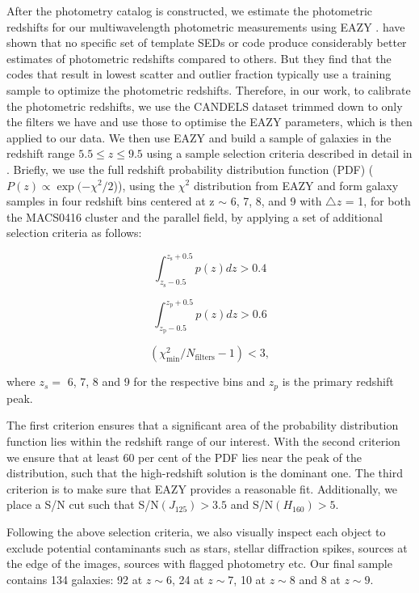 \documentclass[twocolumn]{aastex63}
\begin{document}
After the photometry catalog is constructed, we estimate the photometric redshifts for our multiwavelength photometric measurements using  EAZY \citep{Brammer2008}. \citet{Dahlen2013} have shown that no specific set of template SEDs or code produce considerably better estimates of photometric redshifts compared to others. But they find that the codes that result in lowest scatter and outlier fraction typically use a training sample to optimize the photometric redshifts. Therefore, in our work, to calibrate the photometric redshifts, we use the CANDELS dataset \citep{Guo2013} trimmed down to only the filters we have and use those to optimise the EAZY parameters, which is then applied to our data. We then use EAZY and build a sample of galaxies in the redshift range  $5.5\leq z\leq9.5$ using a sample selection criteria described in detail in \citet{Bhatawdekar2019}. Briefly, we use the full redshift probability distribution function (PDF) ($P(z)\propto\exp(-\chi^{2}/2$)), using the $\chi^{2}$ distribution from EAZY and form galaxy samples in four redshift bins centered at z $\sim$ 6, 7, 8, and 9 with $\triangle z$ =  1, for both the MACS0416 cluster and the parallel field, by applying a set of additional selection criteria as follows:

\begin{equation}
\int_{z_{\mathrm{s}}-0.5}^{z_{\mathrm{s}}+0.5}p(z)dz>0.4
\end{equation}

\begin{equation}
\int_{z_{\mathrm{p}}-0.5}^{z_{\mathrm{p}}+0.5}p(z)dz>0.6
\end{equation}

\begin{equation}
(\chi_{\mathrm{min}}^{2}/N_{\mathrm{filters}}-1)<3,
\end{equation}

\noindent where $z_{s}=$ 6, 7, 8 and 9 for the respective bins and $z_{p}$ is the primary redshift peak.

The first criterion ensures that a significant area of the probability distribution function lies within the redshift range of our interest. With the second criterion we ensure that at least 60 per cent of the PDF lies near the peak of the distribution, such that the high-redshift solution is the dominant one. The third criterion is to make sure that EAZY provides a reasonable fit. Additionally, we place a S/N cut such that S/N$(J_{125})>3.5$ and S/N$(H_{160})>5$.

Following the above selection criteria, we also visually inspect each object to exclude potential contaminants such as stars, stellar diffraction spikes, sources at the edge of the images, sources with flagged photometry etc. Our final sample contains 134 galaxies: 92 at $z\sim6$, 24 at $z\sim7$, 10 at $z\sim8$ and 8 at $z\sim9$.
\end{document}
